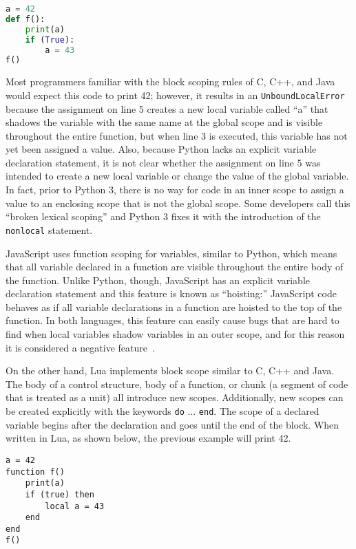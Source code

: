\begin{lstlisting}[language=Python,caption=A demonstration of function scope in Python]
a = 42
def f():
	print(a)
	if (True):
		a = 43
f()
\end{lstlisting}

Most programmers familiar with the block scoping rules of C, C++, and Java would expect
this code to print 42; however, it results in an \texttt{UnboundLocalError} because
the assignment on line 5 creates a new local variable called ``a'' that shadows the
variable with the same name at the global scope and is visible throughout the
entire function, but when line 3 is executed, this variable has not yet been assigned
a value. Also, because Python lacks an explicit variable declaration statement,
it is not clear whether the assignment on line 5 was intended to create a new
local variable or change the value of the global variable. In fact, prior to Python 3,
there is no way for code in an inner scope to assign a value to an enclosing scope
that is not the global scope. Some developers call this ``broken lexical scoping'' and 
Python 3 fixes it with the introduction of the \texttt{nonlocal} statement.

JavaScript uses function scoping for variables, similar to Python, which means that all 
variable declared in a function are visible throughout the entire body of the function.
Unlike Python, though, JavaScript has an explicit variable declaration statement and
this feature is known as ``hoisting:'' JavaScript code behaves as if all 
variable declarations in a function are hoisted to the top of the function. In both
languages, this feature can easily cause bugs that are hard to find when local variables
shadow variables in an outer scope, and for this reason it is considered a negative 
feature~\cite{goodparts}.

On the other hand, Lua implements block scope similar to C, C++ and Java.
The body of a control structure, body of a function, or chunk (a segment of
code that is treated as a unit) all introduce new scopes. Additionally,
new scopes can be created explicitly with the keywords \texttt{do} ... \texttt{end}.
The scope of a declared variable begins after the declaration and goes until the
end of the block. When written in Lua, as shown below, the previous example
will print 42. 

\begin{lstlisting}[language={[5.2]Lua},caption=A demonstration of block scope in Lua]
a = 42
function f()
	print(a)
    if (true) then
        local a = 43
    end
end
f()
\end{lstlisting}

